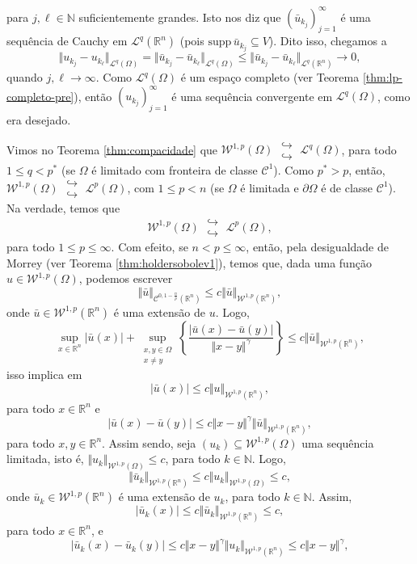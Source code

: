 \documentclass[a4paper, 11pt]{book}
\theoremstyle{definition}
\newcommand{\bN}{\mathbb{N}}
\newcommand{\bR}{\mathbb{R}}
\newcommand{\cC}{\mathcal{C}}
\newcommand{\cL}{\mathcal{L}}
\newcommand{\cW}{\mathcal{W}}
\newcommand{\supp}{\mathrm{supp}\,}
\newcommand{\doublehookrightarrow}{\;\substack{\hookrightarrow \\ \hookrightarrow}\;}
\begin{document}
\begin{prf}
\[    \]
    para $j, \ell \in \bN$ suficientemente grandes.
    Isto nos diz que $(\bar u_{k_j})_{j=1}^\infty$ é uma sequência de Cauchy em $\cL^q(\bR^n)$ (pois $\supp \bar u_{k_j} \subseteq V$).
    Dito isso, chegamos a
    \[
        \Vert u_{k_j} - u_{k_\ell} \Vert_{\cL^q(\Omega)} = \Vert \bar u_{k_j} - \bar u_{k_\ell} \Vert_{\cL^q(\Omega)} \leqslant \Vert \bar u_{k_j} - \bar u_{k_\ell} \Vert_{\cL^q(\bR^n)} \to 0,
    \]
    quando $j,\ell \to \infty$.
    Como $\cL^q(\Omega)$ é um espaço completo (ver Teorema \ref{thm:lp-completo-pre}), então $(u_{k_j})_{j=1}^\infty$ é uma sequência convergente em $\cL^q(\Omega)$, como era desejado.
\end{prf}

Vimos no Teorema \ref{thm:compacidade} que $\cW^{1,p}(\Omega) \doublehookrightarrow \cL^q(\Omega)$, para todo $1 \leqslant q < p^*$ (se $\Omega$ é limitado com fronteira de classe $\cC^1$). Como $p^* > p$, então, $\cW^{1,p}(\Omega) \doublehookrightarrow \cL^p(\Omega)$, com $1 \leqslant p < n$ (se $\Omega$ é limitada e $\partial\Omega$ é de classe $\cC^1$).
Na verdade, temos que
\[
    \cW^{1,p}(\Omega) \doublehookrightarrow \cL^p(\Omega),
\]
para todo $1 \leqslant p \leqslant \infty$.
Com efeito, se $n < p \leqslant \infty$, então, pela desigualdade de Morrey (ver Teorema \ref{thm:holdersobolev1}), temos que, dada uma função $u \in \cW^{1,p}(\Omega)$, podemos escrever
\[
    \Vert \bar u \Vert_{\cC^{0,1-\frac{n}{p}}(\bR^n)} \leqslant c \Vert \bar u \Vert_{\cW^{1,p}(\bR^n)},
\]
onde $\bar u \in \cW^{1,p}(\bR^n)$ é uma extensão de $u$. Logo,
\[
    \sup_{x \in \bR^n} |\bar u(x)| + \sup_{\substack{x,y \in \Omega\\x \neq y}} \left\{ \frac{|\bar u(x) - \bar u(y)|}{\Vert x - y \Vert^\gamma} \right\} \leqslant c \Vert \bar u \Vert_{\cW^{1,p}(\bR^n)},
\]
isso implica em
\[
    |\bar u(x)| \leqslant c \Vert u \Vert_{\cW^{1,p}(\bR^n)},
\]
para todo $x \in \bR^n$ e
\[
    |\bar u(x) - \bar u(y)| \leqslant c \Vert x - y \Vert^\gamma \Vert \bar u \Vert_{\cW^{1,p}(\bR^n)},
\]
para todo $x, y \in \bR^n$.
Assim sendo, seja $(u_k) \subseteq \cW^{1,p}(\Omega)$ uma sequência limitada, isto é, $\Vert u_k \Vert_{\cW^{1,p}(\Omega)} \leqslant c$, para todo $k \in \bN$.
Logo,
\[
    \Vert \bar u_k \Vert_{\cW^{1,p}(\bR^n)} \leqslant c \Vert u_k \Vert_{\cW^{1,p}(\Omega)} \leqslant c,
\]
onde $\bar u_k \in \cW^{1,p}(\bR^n)$ é uma extensão de $u_k$, para todo $k \in \bN$.
Assim,
\[
    |\bar u_k(x)| \leqslant c \Vert \bar u_k \Vert_{\cW^{1,p}(\bR^n)} \leqslant c,
\]
para todo $x \in \bR^n$, e
\[
    | \bar u_k(x) - \bar u_k(y)| \leqslant c \Vert x - y \Vert^\gamma \Vert u_k \Vert_{\cW^{1,p}(\bR^n)} \leqslant c \Vert x - y \Vert^{\gamma},
\]
\end{document}
